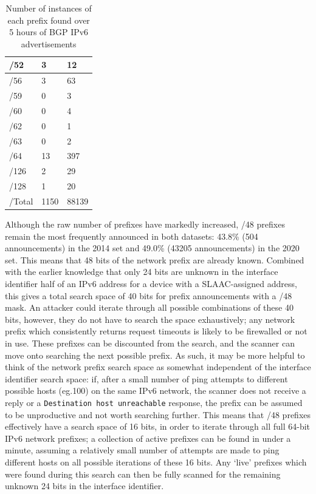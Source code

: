 \documentclass[10pt,sigconf]{acmart}
\begin{document}
\begin{table}[]
\begin{center}
\begin{tabular}{|l|l|l|}
		/52 & 3 & 12   \\ \hline
		/56 & 3 & 63   \\ \hline
		/59 & 0 & 3   \\ \hline
		/60 & 0 & 4   \\ \hline
		/62 & 0 & 1   \\ \hline
		/63 & 0 & 2   \\ \hline
		/64 & 13 & 397   \\ \hline
		/126 & 2 & 29   \\ \hline
		/128 & 1 & 20   \\ \hline
		/Total & 1150 & 88139   \\ \hline
		\hline
	\end{tabular}
	\caption{Number of instances of each prefix found over 5 hours of BGP IPv6 advertisements}
\end{center}
\end{table}


Although the raw number of prefixes have markedly increased, /48 prefixes remain the most frequently announced in both datasets:
43.8\% (504 announcements) in the 2014 set and 49.0\% (43205 announcements) in the 2020 set.
This means that 48 bits of the network prefix are already known.
Combined with the earlier knowledge that only 24 bits are unknown in the interface identifier half of an IPv6 address for a device with a SLAAC-assigned address, this gives a total search space of 40 bits for prefix announcements with a /48 mask.
An attacker could iterate through all possible combinations of these 40 bits, however, they do not have to search the space exhaustively;
any network prefix which consistently returns request timeouts is likely to be firewalled or not in use.
These prefixes can be discounted from the search, and the scanner can move onto searching the next possible prefix.
As such, it may be more helpful to think of the network prefix search space as somewhat independent of the interface identifier search space:
if, after a small number of ping attempts to different possible hosts (eg.100) on the same IPv6 network, the scanner does not receive a reply or a \texttt{Destination host unreachable} response, the prefix can be assumed to be unproductive and not worth searching further.
This means that /48 prefixes effectively have a search space of 16 bits, in order to iterate through all full 64-bit IPv6 network prefixes;
a collection of active prefixes can be found in under a minute, assuming a relatively small number of attempts are made to ping different hosts on all possible iterations of these 16 bits.
Any `live' prefixes which were found during this search can then be fully scanned for the remaining unknown 24 bits in the interface identifier.
\end{document}
